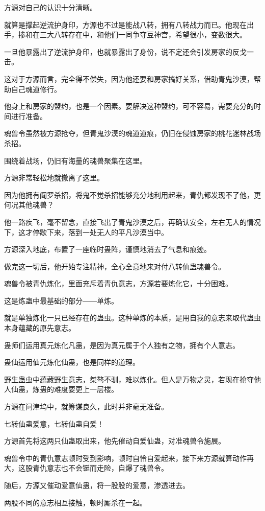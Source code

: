 \begin{this_body}
方源对自己的认识十分清晰。

就算是撑起逆流护身印，方源也不过是能战八转，拥有八转战力而已。他现在出手，掺和在三大八转存在中，和他们一同争夺豆神宫，希望很小，变数很大。

一旦他暴露出了逆流护身印，也就暴露出了身份，说不定还会引发房家的反戈一击。

这对于方源而言，完全得不偿失，因为他还要和房家搞好关系，借助青鬼沙漠，帮助自己魂道修行。

他身上和房家的盟约，也是一个因素。要解决这种盟约，可不容易，需要充分的时间进行准备。

魂兽令虽然被方源抢夺，但青鬼沙漠的魂道道痕，仍旧在侵蚀房家的桃花迷林战场杀招。

围绕着战场，仍旧有海量的魂兽聚集在这里。

方源非常轻松地就撤离了这里。

因为他拥有阎罗杀招，将鬼不觉杀招能够充分地利用起来，青仇都发现不了他，更何况其他魂兽？

他一路疾飞，毫不留念，直接飞出了青鬼沙漠之后，再确认安全，左右无人的情况下，这才停歇下来，落到一处无人的平凡沙漠当中。

方源深入地底，布置了一座临时蛊阵，谨慎地消去了气息和痕迹。

做完这一切后，他开始专注精神，全心全意地来对付八转仙蛊魂兽令。

魂兽令被青仇炼化，里面充斥着青仇意志，方源若要炼化它，十分困难。

这是炼蛊中最基础的部分――单炼。

就是单独炼化一只已经存在的蛊虫。这种单炼的本质，是用自我的意志来取代蛊虫本身蕴藏的原先意志。

蛊师们运用真元炼化凡蛊，是因为真元属于个人独有之物，拥有个人意志。

蛊仙运用仙元炼化仙蛊，也是同样的道理。

野生蛊虫中蕴藏野生意志，桀骜不驯，难以炼化。但人是万物之灵，若现在抢夺他人仙蛊，炼蛊的难度要更上一层楼。

方源在问津坞中，就筹谋良久，此时并非毫无准备。

七转仙蛊爱意，七转仙蛊自爱！

方源首先将这两只仙蛊取出来，他先催动自爱仙蛊，对准魂兽令施展。

魂兽令中的青仇意志顿时受到影响，顿时自怜自爱起来，接下来方源就算动作再大，这股青仇意志也不会铤而走险，自爆了魂兽令。

随后，方源又催动爱意仙蛊，将一股股的爱意，渗透进去。

两股不同的意志相互接触，顿时厮杀在一起。


\end{this_body}
